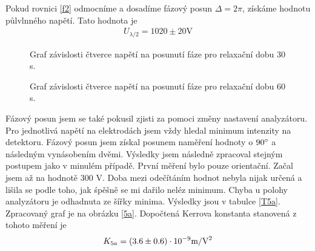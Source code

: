 \documentclass[a4paper,12pt]{article}
\begin{document}
Pokud rovnici \ref{f2} odmocníme a dosadíme fázový posun $\Delta=2\pi$, získáme hodnotu půlvlnného napětí. Tato hodnota je
\begin{eqnarray}
U_{\lambda/2}=1020\pm 20 \mbox{V}
\end{eqnarray}

\begin{figure}
\begin{center}

\end{center}
\caption{Graf závislosti čtverce napětí na posunutí fáze pro relaxační dobu 30 s.}
\label{G30b}
\end{figure}

\begin{figure}
\begin{center}

\end{center}
\caption{Graf závislosti čtverce napětí na posunutí fáze pro relaxační dobu 60 s.}
\label{G60b}
\end{figure}

Fázový posun jsem se také pokusil zjisti za pomoci změny nastavení analyzátoru. Pro jednotlivá napětí na elektrodách jsem vždy hledal minimum intenzity na detektoru. 
Fázový posun jsem získal posunem naměření hodnoty o $90^{\circ}$ a následným vynásobením dvěmi.
Výsledky jsem následně zpracoval stejným postupem jako v minulém případě. První měření bylo pouze orientační. Začal jsem až na hodnotě 300 V. Doba mezi odečítáním 
hodnot nebyla nijak určená a lišila se podle toho, jak śpěšně se mi dařilo neléz minimum. Chyba u polohy analyzátoru je odhadnuta ze šířky minima. Výsledky jsou v tabulce \ref{T5a}. Zpracovaný graf je na obrázku 
\ref{5a}. Dopočtená Kerrova konstanta stanovená z tohoto měření je
\begin{eqnarray}
K_{5a}=(3.6\pm 0.6) \cdot 10^{-9} \mbox{m}/\mbox{V}^2
\end{eqnarray}
\end{document}
